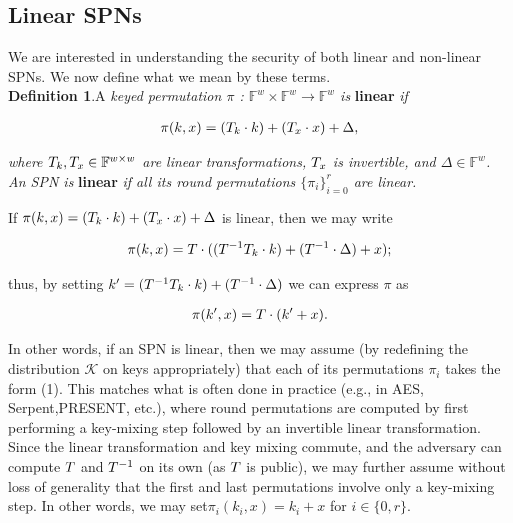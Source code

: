 
\subsection{Linear SPNs}
We are interested in understanding the security of both linear and non-linear SPNs. We now define what we mean by these terms.\\

\noindent \textbf{Definition 1}.A \emph{keyed permutation $\pi$ : $\mathbb{F}^{w} \times \mathbb{F}^{w} \rightarrow \mathbb{F}^{w}$ is} \textbf{linear} \emph{if}

$$
\begin{aligned}
\pi(k,x) = (\mathnormal{T}_{k} \cdot k) + (\mathnormal{T}_{x} \cdot x) + \Delta,
\end{aligned}
$$

\emph{where $\mathnormal{T}_{k}, \mathnormal{T}_{x} \in \mathbb{F}^{w \times w}$ are linear transformations, $\mathnormal{T}_{x}$ is invertible, and $\Delta \in \mathbb{F}^{w}$. An SPN is} \textbf{linear} \emph{ if all its round permutations $\{\pi_{i}\}_{i=0}^{r}$ are linear.}

If $\pi(k,x) = (\mathnormal{T}_{k} \cdot k) + (\mathnormal{T}_{x} \cdot x) + \Delta$ is linear, then we may write

$$
\begin{aligned}
\pi(k,x) = \mathnormal{T} \cdot ((\mathnormal{T}^{-1} \mathnormal{T}_{k} \cdot k) + (\mathnormal{T}^{-1} \cdot \Delta) + x);
\end{aligned}
$$

thus, by setting $k^{\prime} = (\mathnormal{T}^{-1} \mathnormal{T}_{k} \cdot k) + (\mathnormal{T}^{-1} \cdot \Delta)$  we can express $\pi$ as

\begin{equation}
\begin{aligned}
\pi(k^{\prime},x) = \mathnormal{T} \cdot (k^{\prime} + x).
\end{aligned}
\end{equation}

In other words, if an SPN is linear, then we may assume (by redefining the distribution $\mathcal{K}$  on keys appropriately) that each of its permutations $\pi_{i}$ takes the
form (1). This matches what is often done in practice (e.g., in AES, Serpent,PRESENT, etc.), where round permutations are computed by first performing a key-mixing step followed by an invertible linear transformation. Since the linear transformation and key mixing commute, and the adversary can compute $\mathnormal{T}$ and $\mathnormal{T}^{-1}$ on its own (as  $\mathnormal{T}$ is public), we may further assume without loss of generality that the first and last permutations involve only a key-mixing step. In other words, we may set$\pi_{i}(k_{i},x) = k_{i} + x$ for $i \in \{0,r\}$.





